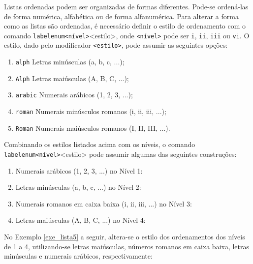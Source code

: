 Listas ordenadas podem ser organizadas de formas diferentes. Pode-se ordená-las de forma numérica, alfabética ou de forma alfanumérica. Para alterar a forma como as listas são ordenadas, é necessário definir o estilo de ordenamento com o comando \texttt{labelenum<nível>}{<estilo>}, onde {\tt <nível>} pode ser {\tt i}, {\tt ii}, {\tt iii} ou {\tt vi}. O estilo, dado pelo modificador {\tt <estilo>}, pode assumir as seguintes opções:

\begingroup
\renewcommand{\labelenumi}{\Alph{enumi})}
\begin{enumerate}
    \item {\tt alph} Letras minúsculas (a, b, c, ...);
    \item {\tt Alph} Letras maiúsculas (A, B, C, ...);
    \item {\tt arabic} Numerais arábicos (1, 2, 3, ...);
    \item {\tt roman} Numerais minúsculos romanos (i, ii, iii, ...);
    \item {\tt Roman} Numerais maiúsculos romanos (I, II, III, ...).
\end{enumerate}
\endgroup

Combinando os estilos listados acima com os níveis, o comando \texttt{labelenum<nível>}{<estilo>} pode assumir algumas das seguintes construções:

\begingroup
\renewcommand{\labelenumi}{\Roman{enumi})}
\begin{enumerate}
    \item Numerais arábicos (1, 2, 3, ...) no Nível 1:\\ \texttt{\renewcommand{\labelenumi}{\arabic{enumi}}}
    \item Letras minúsculas (a, b, c, ...) no Nível 2:\\ \texttt{\renewcommand{\labelenumii}{\alph{enumii}}}
    \item Numerais romanos em caixa baixa (i, ii, iii, ...) no Nível 3:\\ \texttt{\renewcommand{\labelenumiii}{\roman{enumiii}}}
    \item Letras maiúsculas (A, B, C, ...) no Nível 4:\\ \texttt{\renewcommand{\labelenumiv}{\Alph{enumiv}}}
\end{enumerate}
\endgroup

No Exemplo \ref{exe_lista5} a seguir, altera-se o estilo dos ordenamentos dos níveis de 1 a 4, utilizando-se letras maiúsculas, números romanos em caixa baixa, letras minúsculas e numerais arábicos, respectivamente:

